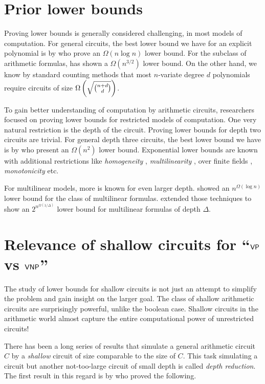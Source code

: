 \section{Prior lower bounds}

Proving lower bounds is generally considered challenging, in most models of computation. For general circuits, the best lower bound we have for an explicit polynomial is by \cite{BS83} who prove an $\Omega(n\log n)$ lower bound. For the subclass of arithmetic formulas, \cite{k85} has shown a $\Omega(n^{3/2})$ lower bound. On the other hand, we know by standard counting methods that most $n$-variate degree $d$ polynomials require circuits of size $\Omega\left(\sqrt{\binom{n+d}{d}}\right)$.

To gain better understanding of computation by arithmetic circuits, researchers focused on proving lower bounds for restricted models of computation. One very natural restriction is the depth of the circuit. Proving lower bounds for depth two circuits are trivial. For general depth three circuits, the best lower bound we have is by \cite{sw2001} who present an $\Omega(n^2)$ lower bound. Exponential lower bounds are known with additional restrictions like \emph{homogeneity} \cite{nw1997}, \emph{multilinearity} \cite{raz2004,raz-yehudayoff}, over finite fields \cite{gr00,grigoriev98}, \emph{monotonicity} \cite{js82} etc. 

For multilinear models, more is known for even larger depth. \cite{raz2004} showed an $n^{\Omega(\log n)}$ lower bound for the class of multilinear formulas. \cite{raz-yehudayoff} extended those techniques to show an $2^{n^{\Omega(1/\Delta)}}$ lower bound for multilinear formulas of depth $\Delta$. 

\section{Relevance of shallow circuits for ``$\mathsf{VP}$ vs $\mathsf{VNP}$''}

The study of lower bounds for shallow circuits is not just an attempt to simplify the problem and gain insight on the larger goal. The class of shallow arithmetic circuits are surprisingly powerful, unlike the boolean case. Shallow circuits in the arithmetic world almost capture the entire computational power of unrestricted circuits! 

There has been a long series of results that simulate a general arithmetic circuit $C$ by a \emph{shallow} circuit of size comparable to the size of $C$. This task simulating a circuit but another not-too-large circuit of small depth is called \emph{depth reduction}. The first result in this regard is by \cite{vsbr83} who proved the following. 

